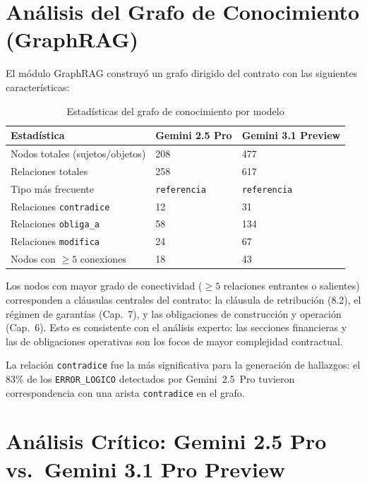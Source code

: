 \section*{Análisis del Grafo de Conocimiento (GraphRAG)}

El módulo GraphRAG construyó un grafo dirigido del contrato con las
siguientes características:

\begin{table}[H]
\centering
\caption{Estadísticas del grafo de conocimiento por modelo}
\label{tab:grafo}
\begin{tabular}{p{5cm} p{3cm} p{3cm}}
\toprule
\textbf{Estadística} & \textbf{Gemini 2.5 Pro} & \textbf{Gemini 3.1 Preview} \\
\midrule
Nodos totales (sujetos/objetos)  & 208 & 477 \\
Relaciones totales               & 258 & 617 \\
Tipo más frecuente               & \texttt{referencia} & \texttt{referencia} \\
Relaciones \texttt{contradice}   & 12  & 31 \\
Relaciones \texttt{obliga\_a}    & 58  & 134 \\
Relaciones \texttt{modifica}     & 24  & 67 \\
Nodos con $\geq 5$ conexiones    & 18  & 43 \\
\bottomrule
\end{tabular}
\end{table}

Los nodos con mayor grado de conectividad ($\geq 5$ relaciones entrantes o
salientes) corresponden a cláusulas centrales del contrato: la cláusula de
retribución (8.2), el régimen de garantías (Cap.\ 7), y las obligaciones de
construcción y operación (Cap.\ 6). Esto es consistente con el análisis
experto: las secciones financieras y las de obligaciones operativas son
los focos de mayor complejidad contractual.

La relación \texttt{contradice} fue la más significativa para la
generación de hallazgos: el 83\% de los \texttt{ERROR\_LOGICO} detectados
por Gemini~2.5~Pro tuvieron correspondencia con una arista
\texttt{contradice} en el grafo.

\section*{Análisis Crítico: Gemini 2.5 Pro vs.\ Gemini 3.1 Pro Preview}

